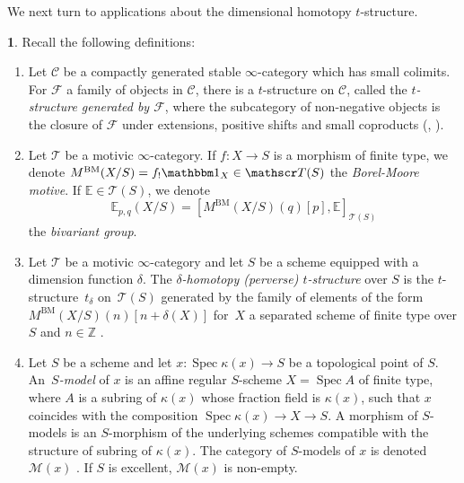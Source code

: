 \documentclass[JEP,XML,SOM,Unicode]{cedram}
\newcommand{\tstructure}{$t$-structure\xspace}
\newcommand{\T}{\mathscr T}
\newcommand{\C}{\mathscr C}
\newcommand{\E}{\mathbb E}
\newcommand{\un}{\mathbbm 1}
\DeclareMathOperator{\spec}{Spec}
\newcommand{\ZZ} {\mathbb Z}
\theoremstyle{remark}
\theoremstyle{definition}
\newtheorem{num}[thm]{}
\numberwithin{equation}{thm}
\begin{document}
We next turn to applications about the dimensional homotopy \tstructure \cite{BD1}.

\begin{num}\label{num:recall_delta_htp}
Recall the following definitions:
\begin{enumerate}
\item
Let $\C$ be a compactly generated stable $\infty$-category which has small colimits. For $\mathcal{F}$ a family of objects in $\C$, there is a \tstructure on $\C$, called the \emph{\tstructure generated by $\mathcal{F}$}, where the subcategory of non-negative objects is the closure of $\mathcal{F}$ under extensions, positive shifts and small coproducts (\cite[Th.\,1.2.6]{BD1}, \cite[Prop.\,2.1.70]{AyoubThesis}).

\item
Let $\T$ be a motivic $\infty$-category. If $f:X\to S$ is a morphism of finite type, we denote $M^{\mathrm{BM}}(X/S)=f_!\un_X\in\T(S)$ the \emph{Borel-Moore motive}. If $\E\in\T(S)$, we denote
\[\E_{p,q}(X/S)=[M^{\mathrm{BM}}(X/S)(q)[p],\E]_{\T(S)}\]
the \emph{bivariant group}.

\item
Let $\T$ be a motivic $\infty$-category and let $S$ be a scheme equipped with a dimension function $\delta$. The \emph{$\delta$-homotopy (perverse) \tstructure} over $S$ is the \tstructure~$t_\delta$ on~$\T(S)$ generated by the family of elements of the form $M^{\mathrm{BM}}(X/S)(n)[n+\delta(X)]$ for~$X$ a separated scheme of finite type over $S$ and $n\in\ZZ$ \cite[Def.\,2.1.1]{BD1}.

\item
Let $S$ be a scheme and let $x:\spec{\kappa(x)}\to S$ be a topological point of $S$. An~\emph{$S$-model} of $x$ is an affine regular $S$-scheme $X=\spec A$ of finite type, where $A$ is a subring of $\kappa(x)$ whose fraction field is $\kappa(x)$, such that $x$ coincides with the composition $\spec{\kappa(x)}\to X\to S$. A morphism of $S$-models is an $S$-morphism of the underlying schemes compatible with the structure of subring of $\kappa(x)$.
The category of $S$-models of $x$ is denoted $\mathcal{M}(x)$ \cite[Def.\,3.2.1]{BD1}. If $S$ is excellent, $\mathcal{M}(x)$ is non-empty.


\end{enumerate}
\end{num}
\end{document}
